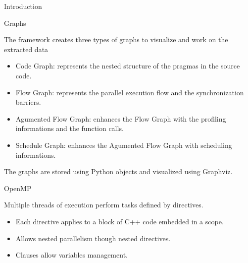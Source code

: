 \documentclass[xcolor=dvipsnames]{beamer}
\begin{document}
\begin{section}{Introduction}
\begin{frame}{\hskip 0.3cm }
\end{frame}









\begin{frame}{\hskip 0.3cm Graphs}


The framework creates three types of graphs to visualize and work on the extracted data 


\begin{itemize}		

\item Code Graph: represents the nested structure of the pragmas in the source code.

\item Flow Graph: represents the parallel execution flow and the synchronization barriers.

\item Agumented Flow Graph: enhances the Flow Graph with the profiling informations and the function calls.

\item Schedule Graph: enhances the Agumented Flow Graph with scheduling informations.


\end{itemize}			

The graphs are stored using Python objects and visualized using Graphviz.



\end{frame}








\begin{frame}{\hskip 0.3cm OpenMP }

Multiple threads of execution perform tasks defined by directives.

\begin{itemize}
\item Each directive applies to  a block of C++ code embedded in a scope.

\item Allows nested parallelism though nested directives.

\item Clauses allow variables management.
\end{itemize}

\begin{block}


\end{block}
\end{frame}
\end{section}
\end{document}
